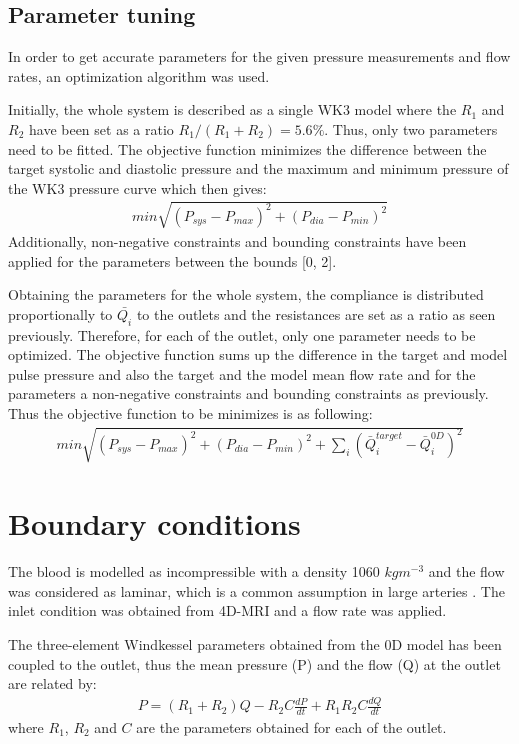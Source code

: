 \subsection{Parameter tuning}
In order to get accurate parameters for the given pressure measurements and flow rates, an optimization algorithm was used. \par

Initially, the whole system is described as a single WK3 model where the $R_1$ and $R_2$ have been set as a ratio $R_1/(R_1+R_2) = 5.6\%$. Thus, only two parameters need to be fitted. The objective function minimizes the difference between the target systolic and diastolic pressure and the maximum and minimum pressure of the WK3 pressure curve which then gives:
\begin{align}
    min \sqrt{(P_{sys}-P_{max})^2+(P_{dia}-P_{min})^2}
\end{align}
 Additionally, non-negative constraints and bounding constraints have been applied for the parameters between the bounds [0, 2]. \par

Obtaining the parameters for the whole system, the compliance is distributed proportionally to $\bar{Q_i}$ to the outlets and the resistances are set as a ratio as seen previously. Therefore, for each of the outlet, only one parameter needs to be optimized. The objective function sums up the difference in the target and model pulse pressure and also the target and the model mean flow rate and for the parameters a non-negative constraints and bounding constraints as previously. Thus the objective function to be minimizes is as following:
\begin{align}
    min \sqrt{(P_{sys}-P_{max})^2+(P_{dia}-P_{min})^2+\sum_{i}(\bar{Q}_{i}^{target}-\bar{Q}_{i}^{0D})^2}
\end{align}


\section{Boundary conditions}
The blood is modelled as incompressible with a density 1060 $kg m^{-3}$ and the flow was considered as laminar, which is a common assumption in large arteries \cite{Alimohammadi2014DevelopmentConditions,Bonfanti2017ComputationalData}. The inlet condition was obtained from 4D-MRI and a flow rate was applied.\par

The three-element Windkessel parameters obtained from the 0D model has been coupled to the outlet, thus the mean pressure (P) and the flow (Q) at the outlet are related by:
\begin{align}
    P=(R_1+R_2)Q-R_2C\frac{dP}{dt}+R_1R_2C\frac{dQ}{dt}
\end{align}
where $R_1$, $R_2$ and $C$ are the parameters obtained for each of the outlet. \par

